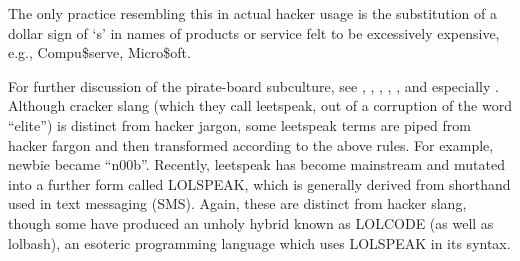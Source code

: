 The only practice resembling this in actual hacker usage is the substitution of a dollar sign of `s' in names of products or service felt
to be excessively expensive, e.g., Compu\$serve, Micro\$oft.

For further discussion of the pirate-board subculture, see , , , ,
, and especially . Although cracker slang (which they call leetspeak, out of a corruption of the
word ``elite'') is distinct from hacker jargon, some leetspeak terms are piped from hacker fargon and then transformed according to the
above rules. For example, newbie became ``n00b''. Recently, leetspeak has become mainstream and mutated into a further form called
LOLSPEAK, which is generally derived from shorthand used in text messaging (SMS). Again, these are distinct from hacker slang, though some
have produced an unholy hybrid known as LOLCODE (as well as lolbash), an esoteric programming language which uses LOLSPEAK in its syntax.

